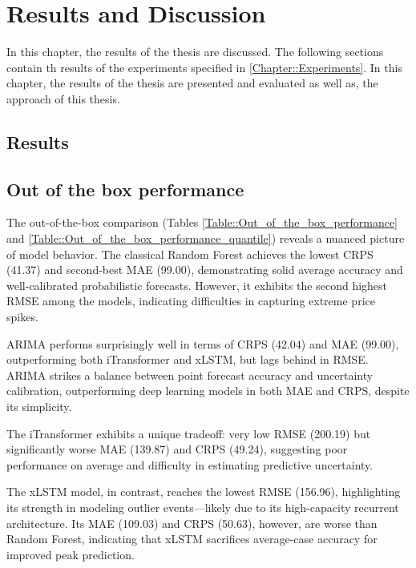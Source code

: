 \documentclass[class=scrbook, crop=false]{standalone}
\begin{document}
\chapter{Results and Discussion} %
\label{Chapter::Results and Discussion}
In this chapter, the results of the thesis are discussed. The following sections contain th results of the experiments specified in \ref{Chapter::Experiments}.                   
    In this chapter, the results of the thesis are presented and evaluated as well as, the approach of this thesis.

\section{Results}
\label{Section::Results}

\section{Out of the box performance}


The out-of-the-box comparison (Tables \ref{Table::Out_of_the_box_performance} and \ref{Table::Out_of_the_box_performance_quantile}) reveals a nuanced picture of model behavior. The classical Random Forest achieves the lowest CRPS (41.37) and second-best MAE (99.00), demonstrating solid average accuracy and well-calibrated probabilistic forecasts. However, it exhibits the second highest RMSE among the models, indicating difficulties in capturing extreme price spikes.

ARIMA performs surprisingly well in terms of CRPS (42.04) and MAE (99.00), outperforming both iTransformer and xLSTM, but lags behind in RMSE. ARIMA strikes a balance between point forecast accuracy and uncertainty calibration, outperforming deep learning models in both MAE and CRPS, despite its simplicity.

The iTransformer exhibits a unique tradeoff: very low RMSE (200.19) but significantly worse MAE (139.87) and CRPS (49.24), suggesting poor performance on average and difficulty in estimating predictive uncertainty.

The xLSTM model, in contrast, reaches the lowest RMSE (156.96), highlighting its strength in modeling outlier events—likely due to its high-capacity recurrent architecture. Its MAE (109.03) and CRPS (50.63), however, are worse than Random Forest, indicating that xLSTM sacrifices average-case accuracy for improved peak prediction.
\end{document}
